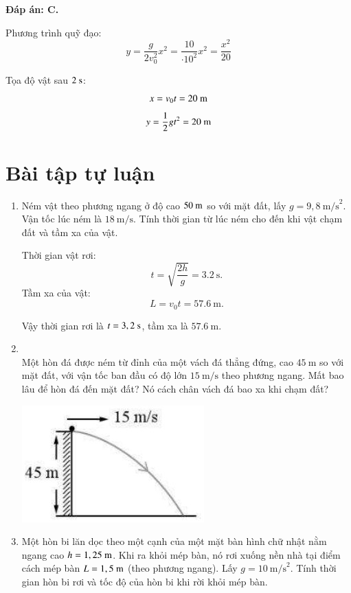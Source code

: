 \begin{enumerate}[label=\bfseries Câu \arabic*:,leftmargin=1.5cm]
	\hideall
	{	\textbf{Đáp án: C.}
		
		Phương trình quỹ đạo:
		\[y=\dfrac{g}{2v_0^2}x^2 = \dfrac{10}{\cdot 10^2}x^2 = \dfrac{x^2}{20}\]
		
		Tọa độ vật sau $2\ \text s$:
		\[x=v_0 t = 20\ \text m\]
		\[y=\dfrac{1}{2}gt^2 = 20\ \text m\]
	}
\end{enumerate}
\section{Bài tập tự luận}
\begin{enumerate}[label=\bfseries Bài \arabic*:,leftmargin=1.5cm]
	\item {}
	
	
	{Ném vật theo phương ngang ở độ cao $50\ \text m$ so với mặt đất, lấy $g=9,8\ \text{m/s}^2$. Vận tốc lúc ném là $18\ \text{m/s}$. Tính thời gian từ lúc ném cho đến khi vật chạm đất và tầm xa của vật.
	}
	
	\hideall
	{
		Thời gian vật rơi:
		$$t=\sqrt{\dfrac{2h}{g}}=\SI{3.2}{\second}.$$
		Tầm xa của vật:
		$$L=v_0t=\SI{57.6}{\meter}.$$
		
		Vậy thời gian rơi là $t=3,2\ \text s$, tầm xa là $\SI{57.6}{\meter}$.
	}

\item {}\\
Một hòn đá được ném từ đỉnh của một vách đá thẳng đứng, cao $\SI{45}{\meter}$ so với mặt đất, với vận tốc ban đầu có độ lớn $\SI{15}{\meter/\second}$ theo phương ngang. Mất bao lâu để hòn đá đến mặt đất? Nó cách chân vách đá bao xa khi chạm đất?
\begin{center}
	\includegraphics[width=0.2\linewidth]{../figs/VN10-2022-PH-TP012-P-1}
\end{center}

	\item {}
	
	
	{Một hòn bi lăn dọc theo một cạnh của một mặt bàn hình chữ nhật nằm ngang cao $h=1,25\ \text m$. Khi ra khỏi mép bàn, nó rơi xuống nền nhà tại điểm cách mép bàn $L=1,5\ \text m$ (theo phương ngang). Lấy $g=10\ \text{m/s}^2$. Tính thời gian hòn bi rơi và tốc độ của hòn bi khi rời khỏi mép bàn.
	}
	

\end{enumerate}
